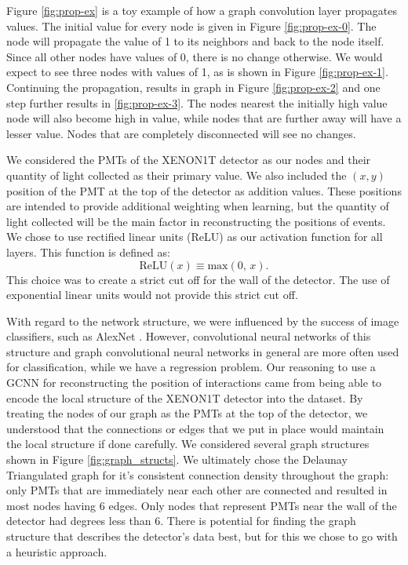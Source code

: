 \documentclass[thesis.tex]{subfiles}
\begin{document}
\par Figure \ref{fig:prop-ex} is a toy example of how a graph convolution layer propagates values.
The initial value for every node is given in Figure \ref{fig:prop-ex-0}.
The node will propagate the value of 1 to its neighbors and back to the node itself.
Since all other nodes have values of 0, there is no change otherwise.
We would expect to see three nodes with values of 1, as is shown in Figure \ref{fig:prop-ex-1}.
Continuing the propagation, results in graph in Figure \ref{fig:prop-ex-2} and one step further results in \ref{fig:prop-ex-3}.
The nodes nearest the initially high value node will also become high in value, while nodes that are further away will have a lesser value.
Nodes that are completely disconnected will see no changes.

\par We considered the PMTs of the XENON1T detector as our nodes and their quantity of light collected as their primary value.
We also included the $(x,y)$ position of the PMT at the top of the detector as addition values.
These positions are intended to provide additional weighting when learning, but the quantity of light collected will be the main factor in reconstructing the positions of events.
We chose to use rectified linear units (ReLU) as our activation function for all layers.
This function is defined as:
\begin{equation}
	\text{ReLU}\left( x \right) \equiv \text{max}\left(0,\,x\right) .
\end{equation}
This choice was to create a strict cut off for the wall of the detector.
The use of exponential linear units would not provide this strict cut off.

\par With regard to the network structure, we were influenced by the success of image classifiers, such as AlexNet \cite{AlexNet}.
However, convolutional neural networks of this structure and graph convolutional neural networks in general are more often used for classification, while we have a regression problem.
Our reasoning to use a GCNN for reconstructing the position of interactions came from being able to encode the local structure of the XENON1T detector into the dataset.
By treating the nodes of our graph as the PMTs at the top of the detector, we understood that the connections or edges that we put in place would maintain the local structure if done carefully.
We considered several graph structures shown in Figure \ref{fig:graph_structs}.
We ultimately chose the Delaunay Triangulated graph for it's consistent connection density throughout the graph: only PMTs that are immediately near each other are connected and resulted in most nodes having 6 edges.
Only nodes that represent PMTs near the wall of the detector had degrees less than 6.
There is potential for finding the graph structure that describes the detector's data best, but for this we chose to go with a heuristic approach.
\end{document}
